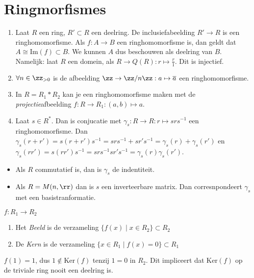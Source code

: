 \documentclass[a4paper,12pt,oneside]{book}
\begin{document}
\chapter{Ringmorfismes}
\begin{voorbeeld}
\begin{enumerate}[label=(\alph*)]
\item Laat $R$ een ring, $R' \subset R$ een deelring. De inclusiefabeelding $R' \to R$ is een ringhomomorfisme. Als $f : A \to B$ een ringhomomorfisme is, dan geldt dat $A \cong \mathrm{Im}(f) \subset B$. We kunnen $A$ dus beschouwen als deelring van $B$. Namelijk: laat $R$ een domein, als $R \to Q(R) : r \mapsto \frac{r}{1}$. Dit is injectief.
 \item $\forall n \in \zz_{> 0}$ is de afbeelding $\zz \to \zz/n\zz : a \mapsto \overline{a}$ een ringhomomorfisme.
 \item In $R = R_1 * R_2$ kan je  een ringhomomorfisme maken met de \textit{projectie}afbeelding $f : R \to R_1 : (a,b) \mapsto a$.
 \item Laat $s \in R^*$. Dan is conjucatie met $\gamma_s : R \to R : r \mapsto srs^{-1}$ een ringhomomorfisme. Dan $\gamma_s(r + r') = s(r + r')s^{-1} = srs^{-1} + sr's^{-1} = \gamma_s(r) + \gamma_s(r')$ en $\gamma_s(rr') = s(rr')s^{-1} = srs^{-1}sr's^{-1} = \gamma_s(r)\gamma_s(r')$.
\end{enumerate}
\end{voorbeeld}


\begin{opmerking}
\begin{itemize}
\item Als $R$ commutatief is, dan is $\gamma_s$ de indentiteit.
\item Als $R = M(n,\rr)$ dan is $s$ een inverteerbare matrix. Dan corresnpondeert $\gamma_s$ met een basistranformatie.
\end{itemize}
\end{opmerking}

\begin{definitie}
$f : R_1 \to R_2$
\begin{enumerate}
\item Het \textit{Beeld} is de verzameling $\{f(x) \mid x \in R_2\} \subset R_2$
\item De \textit{Kern} is de verzameling $\{x \in R_1 \mid f(x) = 0\} \subset R_1$
\end{enumerate}
\end{definitie}

\begin{opmerking}
$f(1) = 1$, dus $1 \not \in \mathrm{Ker}(f)$ tenzij $1 = 0$ in $R_2$. Dit impliceert dat $\mathrm{Ker}(f)$ op de triviale ring nooit een deelring is.
\end{opmerking}
\end{document}
